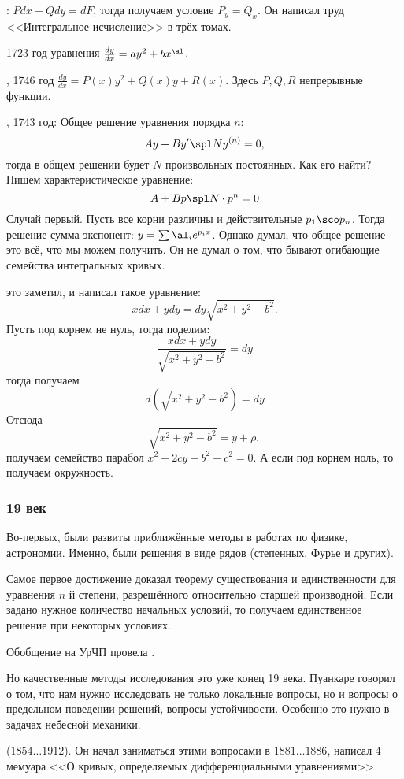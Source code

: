 \documentclass[a4paper,oneside,fleqn,10pt]{article}
\newcommand{\pe}[2]{${#1}\ldots{#2}$}
\begin{document}
: $Pdx + Qdy = dF$, тогда получаем условие $P_y = Q_x$. Он написал
труд <<Интегральное исчисление>> в трёх томах.

1723 год уравнения  $\frac{dy}{dx} = ay^2 + bx^\al$.

, 1746 год $\frac{dy}{dx} = P(x)y^2 + Q(x)y + R(x)$.
Здесь $P, Q, R$ непрерывные функции.

, 1743 год: Общее решение уравнения порядка $n$:
$$Ay + B y' \spl N y^{(n)} = 0,$$
тогда в общем решении будет $N$ произвольных постоянных.
Как его найти? Пишем характеристическое уравнение:
$$A + Bp \spl N \cdot p^n =0$$
Случай первый. Пусть все корни различны и действительные $p_1\sco p_n$.
Тогда решение сумма экспонент:
$y = \sum \al_i e^{p_i x}$.
Однако  думал, что общее решение это всё, что мы можем получить.
Он не думал о том, что бывают огибающие семейства интегральных кривых.

 это заметил, и написал такое уравнение:
$$x dx + y dy = dy \sqrt{x^2 + y^2 - b^2}.$$
Пусть под корнем не нуль, тогда поделим:
$$\frac{x dx + y dy}{\sqrt{x^2 + y^2 - b^2}} = dy$$
тогда получаем
$$d(\sqrt{x^2 + y^2 - b^2}) = dy$$
Отсюда
$$\sqrt{x^2 + y^2 - b^2} = y + \rho,$$
получаем семейство парабол
$x^2 - 2cy - b^2 -c^2 = 0$.
А если под корнем ноль, то получаем окружность.

\subsubsection{19 век}

Во-первых, были развиты приближённые методы в работах по физике, астрономии.
Именно, были решения в виде рядов (степенных, Фурье и других).

Самое первое достижение  доказал теорему существования и единственности
для уравнения $n$ й степени, разрешённого относительно старшей производной.
Если задано нужное количество начальных условий, то получаем единственное решение
при некоторых условиях.

Обобщение на УрЧП провела .

Но качественные методы исследования это уже конец 19 века.
Пуанкаре говорил о том, что нам нужно исследовать не только локальные вопросы,
но и вопросы о предельном поведении решений, вопросы устойчивости.
Особенно это нужно в задачах небесной механики.

 (\pe{1854}{1912}). Он начал заниматься этими вопросами в \pe{1881}{1886},
написал 4 мемуара <<О кривых, определяемых дифференциальными уравнениями>>
\end{document}
